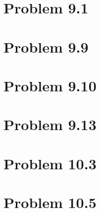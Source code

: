 \documentclass[11pt,a4paper,oneside]{report}
\begin{document}
\section*{Problem 9.1}
\section*{Problem 9.9}
\section*{Problem 9.10}
\section*{Problem 9.13}
\section*{Problem 10.3}
\section*{Problem 10.5}
\end{document}
